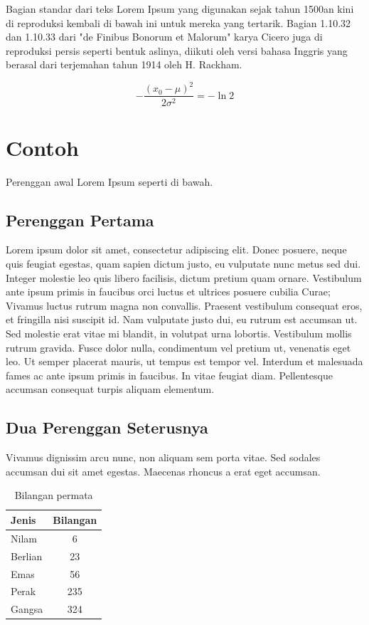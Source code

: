 Bagian standar dari teks Lorem Ipsum yang digunakan sejak tahun 1500an kini di reproduksi kembali di bawah ini untuk mereka yang tertarik. Bagian 1.10.32 dan 1.10.33 dari "de Finibus Bonorum et Malorum" karya Cicero juga di reproduksi persis seperti bentuk aslinya, diikuti oleh versi bahasa Inggris yang berasal dari terjemahan tahun 1914 oleh H. Rackham.

\begin{equation}
-\frac{(x_0 - \mu)^2}{2 \sigma^2} = -\ln 2
\end{equation}


\section{Contoh}
\label{sec:contol}

Perenggan awal Lorem Ipsum seperti di bawah.

\subsection{Perenggan Pertama}

Lorem ipsum dolor sit amet, consectetur adipiscing elit. Donec posuere, neque quis feugiat egestas, quam sapien dictum justo, eu vulputate nunc metus sed dui. Integer molestie leo quis libero facilisis, dictum pretium quam ornare. Vestibulum ante ipsum primis in faucibus orci luctus et ultrices posuere cubilia Curae; Vivamus luctus rutrum magna non convallis. Praesent vestibulum consequat eros, et fringilla nisi suscipit id. Nam vulputate justo dui, eu rutrum est accumsan ut. Sed molestie erat vitae mi blandit, in volutpat urna lobortis. Vestibulum mollis rutrum gravida. Fusce dolor nulla, condimentum vel pretium ut, venenatis eget leo. Ut semper placerat mauris, ut tempus est tempor vel. Interdum et malesuada fames ac ante ipsum primis in faucibus. In vitae feugiat diam. Pellentesque accumsan consequat turpis aliquam elementum.


\subsection{Dua Perenggan Seterusnya}

Vivamus dignissim arcu nunc, non aliquam sem porta vitae. Sed sodales accumsan dui sit amet egestas. Maecenas rhoncus a erat eget accumsan. 

\begin{table}[hbt!]\centering
\caption{Bilangan permata}

\begin{tabular}{l c}
\hline
Jenis & Bilangan \\\hline
Nilam & 6\\
Berlian & 23\\
Emas & 56\\
Perak & 235\\
Gangsa & 324\\\hline
\end{tabular}
\end{table}

